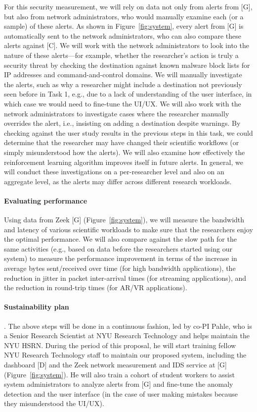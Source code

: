 For this security measurement, we will rely on data not only from alerts from [G], but also from network administrators, who would manually examine each (or a sample) of these alerts. As shown in Figure~\ref{fig:system}, every alert from [G] is automatically sent to the network administrators, who can also compare these alerts against [C]. We will  work with the network administrators to look into the nature of these alerts---for example, whether the researcher's action is truly a security threat by checking the destination against known malware block lists for IP addresses and command-and-control domains.  We will manually investigate the alerts, such as why a researcher might include a destination not previously seen before in Task 1, e.g., due to a lack of understanding of the user interface, in which case we would need to fine-tune the UI/UX. We will also work with the network administrators to investigate cases where the researcher manually overrides the alert, i.e., insisting on adding a destination despite warnings. By checking against the user study results in the previous steps in this task, we could determine that the researcher may have changed their scientific workflows (or simply misunderstood how the alerts). We will also examine how effectively the reinforcement learning algorithm improves itself in future alerts. In general, we will conduct these investigations on a per-researcher level and also on an aggregate level, as the alerts may differ across different research workloads.

\paragraph{Evaluating performance}
Using data from Zeek [G] (Figure~\ref{fig:system}), we will measure the bandwidth and latency of various scientific workloads to make sure that the researchers enjoy the optimal performance. We will also compare against the slow path for the same activities (e.g., based on data before the researchers started using our system) to measure the performance improvement in terms of the increase in average bytes sent/received over time (for high bandwidth applications),  the reduction in jitter in packet inter-arrival times (for streaming applications), and the reduction in round-trip times (for AR/VR applications).


\paragraph{Sustainability plan}.
The above steps will be done in a continuous fashion, led by co-PI Pahle, who is a Senior Research Scientist at NYU Research Technology and helps maintain the NYU HSRN. During the period of this proposal, he will start training fellow NYU Research Technology staff to maintain our proposed system, including the dashboard [D] and the Zeek network measurement and IDS service at [G] (Figure~\ref{fig:system}). He will also train a cohort of student workers to assist system administrators to analyze alerts from [G] and fine-tune the anomaly detection and the user interface (in the case of user making mistakes because they misunderstood the UI/UX).



